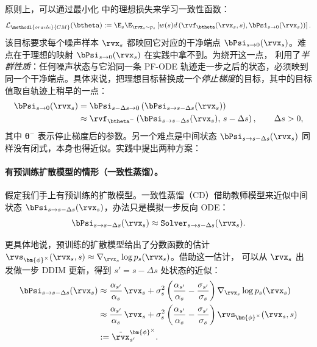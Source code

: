 原则上，可以通过最小化  中的理想损失来学习一致性函数：
\[
    \mathcal{L}_{\methodl{oracle}{CM}}(\btheta)
    := \E_{s} \E_{\rvx_s\sim p_s} \left[ w(s)  d \left(\rvf_\btheta(\rvx_s,s), \bPsi_{s\to 0}(\rvx_s)\right)\right].
\]
该目标要求每个噪声样本 $\rvx_s$ 都映回它对应的干净端点 $\bPsi_{s\to 0}(\rvx_s)$。难点在于理想的映射 $\bPsi_{s\to 0}(\rvx_s)$ 在实践中拿不到。为绕开这一点，\citet{song2023consistency} 利用了\emph{半群性质}：任何噪声状态与它沿同一条 PF-ODE 轨迹走一步之后的状态，必须映到同一个干净端点。具体来说，把理想目标替换成一个\emph{停止梯度}的目标，其中的目标值取自轨迹上稍早的一点：
\begin{align*}
    \bPsi_{s\to 0}(\rvx_s)
    &= \bPsi_{s-\Delta s \to 0} \left(\bPsi_{s\to s-\Delta s}(\rvx_s)\right) \\
    &\approx \rvf_{\btheta^-} \left(\bPsi_{s\to s-\Delta s}(\rvx_s),\,s-\Delta s\right),
    \qquad \Delta s > 0,
\end{align*}
其中 $\bm{\theta}^-$ 表示停止梯度后的参数。另一个难点是中间状态 $\bPsi_{s\to s-\Delta s}(\rvx_s)$ 同样没有闭式，本身也得近似。实践中提出两种方案：

\paragraph{有预训练扩散模型的情形（一致性蒸馏）。}
假定我们手上有预训练的扩散模型。一致性蒸馏（CD）借助教师模型来近似中间状态 $\bPsi_{s\to s-\Delta s}(\rvx_s)$，办法只是模拟一步反向 ODE：
\[
 \bPsi_{s\to s-\Delta s}(\rvx_s)  \approx  \mathtt{Solver}_{s \to s-\Delta s}(\rvx_s).
\]

更具体地说，预训练的扩散模型给出了分数函数的估计
$\rvs_{\bm{\phi}^\times}(\rvx_s, s) \approx \nabla_{\rvx_s}\log p_s(\rvx_s)$。借助这一估计，
可以从 $\rvx_s$ 出发做一步 DDIM 更新，得到 $s' = s-\Delta s$ 处状态的近似：
\begin{align*}
    \bPsi_{s\to s-\Delta s}(\rvx_s)
    &\approx \frac{\alpha_{s'}}{\alpha_s}\,\rvx_s
    + \sigma_s^2 \left( \frac{\alpha_{s'}}{\alpha_s} - \frac{\sigma_{s'}}{\sigma_s} \right)\nabla_{\rvx_s}\log p_s(\rvx_s) \\
    &\approx \frac{\alpha_{s'}}{\alpha_s}\,\rvx_s
    + \sigma_s^2 \left( \frac{\alpha_{s'}}{\alpha_s} - \frac{\sigma_{s'}}{\sigma_s} \right)\rvs_{\bm{\phi}^\times}(\rvx_s, s) \\
    &:= \tilde{\rvx}_{s'}^{\bm{\phi}^\times}.
\end{align*}

